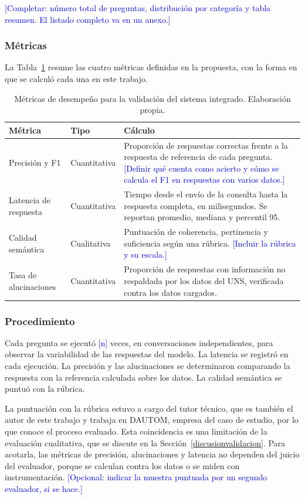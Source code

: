 \textcolor{blue}{[Completar: número total de preguntas, distribución por categoría y tabla resumen. El listado completo va en un anexo.]}

\subsubsection{Métricas}

La Tabla~\ref{tab:metricas_validacion} resume las cuatro métricas definidas en la propuesta, con la forma en que se calculó cada una en este trabajo.

\begin{table}[H]
\centering
\caption{Métricas de desempeño para la validación del sistema integrado. Elaboración propia.}
\label{tab:metricas_validacion}
\renewcommand{\arraystretch}{1.3}
\begin{tabular}{p{3cm}p{3cm}p{8cm}}
\hline
\textbf{Métrica} & \textbf{Tipo} & \textbf{Cálculo} \\
\hline
Precisión y F1 & Cuantitativa & Proporción de respuestas correctas frente a la respuesta de referencia de cada pregunta. \textcolor{blue}{[Definir qué cuenta como acierto y cómo se calcula el F1 en respuestas con varios datos.]} \\
Latencia de respuesta & Cuantitativa & Tiempo desde el envío de la consulta hasta la respuesta completa, en milisegundos. Se reportan promedio, mediana y percentil 95. \\
Calidad semántica & Cualitativa & Puntuación de coherencia, pertinencia y suficiencia según una rúbrica. \textcolor{blue}{[Incluir la rúbrica y su escala.]} \\
Tasa de alucinaciones & Cuantitativa & Proporción de respuestas con información no respaldada por los datos del UNS, verificada contra los datos cargados. \\
\hline
\end{tabular}
\end{table}

\subsubsection{Procedimiento}

Cada pregunta se ejecutó \textcolor{blue}{[n]} veces, en conversaciones independientes, para observar la variabilidad de las respuestas del modelo. La latencia se registró en cada ejecución. La precisión y las alucinaciones se determinaron comparando la respuesta con la referencia calculada sobre los datos. La calidad semántica se puntuó con la rúbrica.

La puntuación con la rúbrica estuvo a cargo del tutor técnico, que es también el autor de este trabajo y trabaja en DAUTOM, empresa del caso de estudio, por lo que conoce el proceso evaluado. Esta coincidencia es una limitación de la evaluación cualitativa, que se discute en la Sección~\ref{discusionvalidacion}. Para acotarla, las métricas de precisión, alucinaciones y latencia no dependen del juicio del evaluador, porque se calculan contra los datos o se miden con instrumentación. \textcolor{blue}{[Opcional: indicar la muestra puntuada por un segundo evaluador, si se hace.]}
